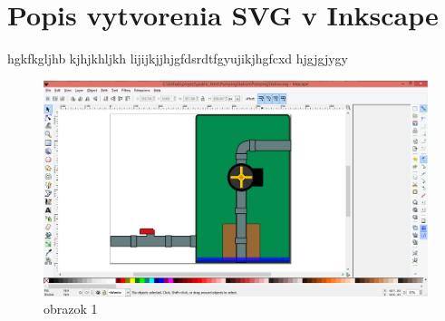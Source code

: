 \chapter{Popis vytvorenia SVG v Inkscape}

hgkfkgljhb kjhjkhljkh lijijkjjhjgfdsrdtfgyujikjhgfcxd 
hjgjgjygy 

\begin{figure}[ht]
	\begin{center}
		\includegraphics{obrazky/obr1.png}
		\caption{obrazok 1}
		\label{picture2}
	\end{center}
\end{figure}